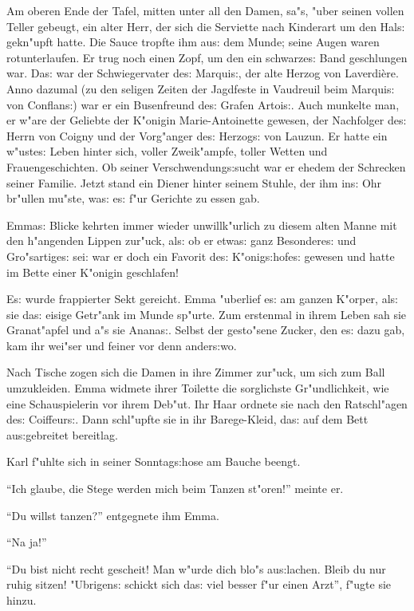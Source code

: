 \documentclass[oneside,12pt]{book}
\newcommand{\s}{s:}%
\begin{document}
Am oberen Ende der Tafel, mitten unter all den Damen, sa"s, "uber
seinen vollen Teller gebeugt, ein alter Herr, der sich die
Serviette nach Kinderart um den Hal{\s} gekn"upft hatte. Die Sauce
tropfte ihm au{\s} dem Munde; seine Augen waren rotunterlaufen. Er
trug noch einen Zopf, um den ein schwarze{\s} Band geschlungen
war. Da{\s} war der Schwiegervater de{\s} Marqui{\s}, der alte
Herzog von Laverdi\`ere. Anno dazumal (zu den seligen Zeiten der
Jagdfeste in Vaudreuil beim Marqui{\s} von Conflan{\s}) war er ein
Busenfreund de{\s} Grafen Artoi{\s}. Auch munkelte man, er w"are
der Geliebte der K"onigin Marie-Antoinette gewesen, der Nachfolger
de{\s} Herrn von Coigny und der Vorg"anger de{\s} Herzog{\s} von
Lauzun. Er hatte ein w"uste{\s} Leben hinter sich, voller
Zweik"ampfe, toller Wetten und Frauengeschichten. Ob seiner
Verschwendung{\s}sucht war er ehedem der Schrecken seiner Familie.
Jetzt stand ein Diener hinter seinem Stuhle, der ihm in{\s} Ohr
br"ullen mu"ste, wa{\s} e{\s} f"ur Gerichte zu essen gab.

Emma{\s} Blicke kehrten immer wieder unwillk"urlich zu diesem
alten Manne mit den h"angenden Lippen zur"uck, al{\s} ob er
etwa{\s} ganz Besondere{\s} und Gro"sartige{\s} sei: war er doch
ein Favorit de{\s} K"onig{\s}hofe{\s} gewesen und hatte im Bette
einer K"onigin geschlafen!

E{\s} wurde frappierter Sekt gereicht. Emma "uberlief e{\s} am
ganzen K"orper, al{\s} sie da{\s} eisige Getr"ank im Munde
sp"urte. Zum erstenmal in ihrem Leben sah sie Granat"apfel und a"s
sie Anana{\s}. Selbst der gesto"sene Zucker, den e{\s} dazu gab,
kam ihr wei"ser und feiner vor denn ander{\s}wo.

Nach Tische zogen sich die Damen in ihre Zimmer zur"uck, um sich
zum Ball umzukleiden. Emma widmete ihrer Toilette die sorglichste
Gr"undlichkeit, wie eine Schauspielerin vor ihrem Deb"ut. Ihr Haar
ordnete sie nach den Ratschl"agen de{\s} Coiffeur{\s}. Dann
schl"upfte sie in ihr Barege-Kleid, da{\s} auf dem Bett
au{\s}gebreitet bereitlag.

Karl f"uhlte sich in seiner Sonntag{\s}hose am Bauche beengt.

"`Ich glaube, die Stege werden mich beim Tanzen st"oren!"' meinte
er.

"`Du willst tanzen?"' entgegnete ihm Emma.

"`Na ja!"'

"`Du bist nicht recht gescheit! Man w"urde dich blo"s au{\s}lachen.
Bleib du nur ruhig sitzen! "Ubrigen{\s} schickt sich da{\s} viel
besser f"ur einen Arzt"', f"ugte sie hinzu.
\end{document}
